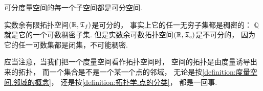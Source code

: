 \begin{corollary}
可分度量空间的每一个子空间都是可分空间.
\end{corollary}

\begin{example}
实数余有限拓扑空间\((\mathbb{R},{\mathfrak T}_f)\)是可分的，
事实上它的任一无穷子集都是稠密的：
\(\mathbb{Q}\)就是它的一个可数稠密子集.
但是实数余可数拓扑空间\((\mathbb{R},{\mathfrak T}_c)\)是不可分的，
因为它的任一可数集都是闭集，不可能稠密.
\end{example}

\begin{remark}
应当注意，当我们把一个度量空间看作拓扑空间时，
空间的拓扑是由度量诱导出来的拓扑，
而一个集合是不是一个某一个点的邻域，
无论是按\cref{definition:度量空间.邻域的概念}，
还是按\cref{definition:拓扑学.点的分类}，
都是一回事.
\end{remark}
